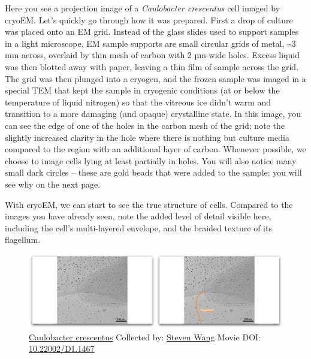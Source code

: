 \documentclass[]{tufte-book}
\begin{document}
Here you see a projection image of a \emph{Caulobacter crescentus} cell
imaged by cryoEM. Let's quickly go through how it was prepared. First a
drop of culture was placed onto an EM grid. Instead of the glass slides
used to support samples in a light microscope, EM sample supports are
small circular grids of metal, \textasciitilde{}3 mm across, overlaid by
thin mesh of carbon with 2 µm-wide holes. Excess liquid was then blotted
away with paper, leaving a thin film of sample across the grid. The grid
was then plunged into a cryogen, and the frozen sample was imaged in a
special TEM that kept the sample in cryogenic conditions (at or below
the temperature of liquid nitrogen) so that the vitreous ice didn't warm
and transition to a more damaging (and opaque) crystalline state. In
this image, you can see the edge of one of the holes in the carbon mesh
of the grid; note the slightly increased clarity in the hole where there
is nothing but culture media compared to the region with an additional
layer of carbon. Whenever possible, we choose to image cells lying at
least partially in holes. You will also notice many small dark circles
-- these are gold beads that were added to the sample; you will see why
on the next page.

With cryoEM, we can start to see the true structure of cells. Compared
to the images you have already seen, note the added level of detail
visible here, including the cell's multi-layered envelope, and the
braided texture of its flagellum.





\begin{figure}
\includegraphics{movie_stills/1_5} \caption[\protect\hyperlink{tree}{Caulobacter crescentus} Collected by:
\protect\hyperlink{steven_wang}{Steven Wang} Movie DOI:
\href{https://doi.org/10.22002/D1.1467}{10.22002/D1.1467}]{\protect\hyperlink{tree}{Caulobacter crescentus} Collected by:
\protect\hyperlink{steven_wang}{Steven Wang} Movie DOI:
\href{https://doi.org/10.22002/D1.1467}{10.22002/D1.1467}}\label{fig:1-5}
\end{figure}
\end{document}

